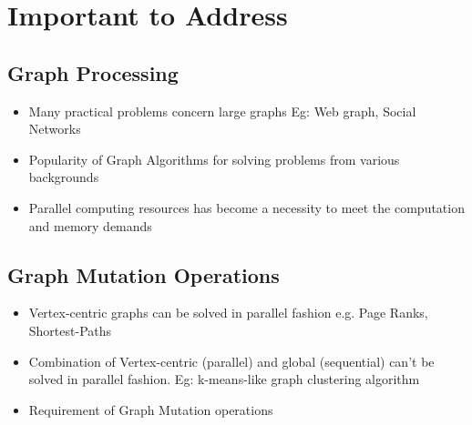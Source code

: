 \section{Important to Address}
\subsection{Graph Processing}
\begin{frame}
\begin{itemize}
  \item Many practical problems concern large graphs Eg: Web graph, Social Networks
  \item Popularity of Graph Algorithms for solving problems from various backgrounds
  \item Parallel computing resources has become a necessity to meet the computation  and memory demands
\end{itemize}
\end{frame}

\subsection{Graph Mutation Operations}
\begin{frame}
\begin{itemize}
	\item Vertex-centric graphs can be solved in parallel fashion e.g. Page Ranks, Shortest-Paths
	\item Combination of Vertex-centric (parallel) and global (sequential) can't be solved in parallel fashion. Eg: k-means-like graph clustering algorithm
	\item Requirement of Graph Mutation operations
\end{itemize}
\end{frame}


